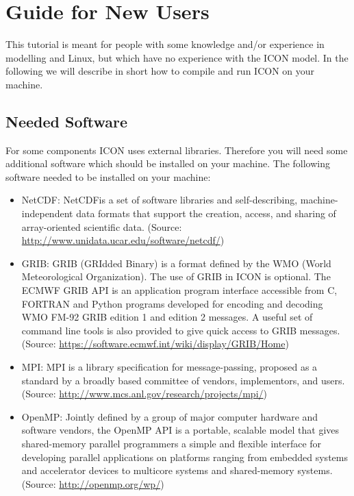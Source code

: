 \chapter{Guide for New Users}

\newcommand{\netcdf}{NetCDF}


This tutorial is meant for people with some knowledge and/or experience in modelling and Linux, but which have no experience with the ICON model. In the following we will describe in short how to compile and run ICON on your machine. 

\section{Needed Software}

For some components ICON uses external libraries. Therefore you will need some additional software which should be installed on your machine. The following software needed to be installed on your machine:

\begin{itemize}
 \item \netcdf : \netcdf is a set of software libraries and self-describing, machine-independent data formats that support the creation, access, and sharing of array-oriented scientific data.\newline
 (Source: \href{http://www.unidata.ucar.edu/software/netcdf/}{http://www.unidata.ucar.edu/software/netcdf/})
 \item GRIB: GRIB (GRIdded Binary) is a format defined by the WMO (World Meteorological Organization). The use of GRIB in ICON is optional. The ECMWF GRIB API is an application program interface accessible from C, FORTRAN and Python programs developed for encoding and decoding WMO FM-92 GRIB edition 1 and edition 2 messages. A useful set of command line tools is also provided to give quick access to GRIB messages. \newline
 (Source: \href{https://software.ecmwf.int/wiki/display/GRIB/Home}{https://software.ecmwf.int/wiki/display/GRIB/Home})
 \item MPI: MPI is a library specification for message-passing, proposed as a standard by a broadly based committee of vendors, implementors, and users.\newline
 (Source: \href{http://www.mcs.anl.gov/research/projects/mpi/}{http://www.mcs.anl.gov/research/projects/mpi/})
 \item OpenMP: Jointly defined by a group of major computer hardware and software vendors, the OpenMP API is a portable, scalable model that gives shared-memory parallel programmers a simple and flexible interface for developing parallel applications on platforms ranging from embedded systems and accelerator devices to multicore systems and shared-memory systems.\newline
 (Source: \href{http://openmp.org/wp/}{http://openmp.org/wp/})
\end{itemize}


